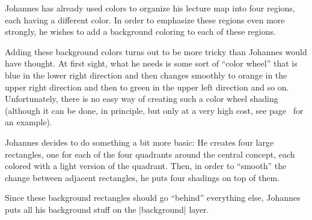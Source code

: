 Johannes has already used colors to organize his lecture map into four regions,
each having a different color. In order to emphasize these regions even more
strongly, he wishes to add a background coloring to each of these regions.

Adding these background colors turns out to be more tricky than Johannes would
have thought. At first sight, what he needs is some sort of ``color wheel''
that is blue in the lower right direction and then changes smoothly to orange
in the upper right direction and then to green in the upper left direction and
so on. Unfortunately, there is no easy way of creating such a color wheel
shading (although it can be done, in principle, but only at a very high cost,
see page~\pageref{shading-color-wheel} for an example).

Johannes decides to do something a bit more basic: He creates four large
rectangles, one for each of the four quadrants around the central concept, each
colored with a light version of the quadrant. Then, in order to ``smooth'' the
change between adjacent rectangles, he puts four shadings on top of them.

Since these background rectangles should go ``behind'' everything else,
Johannes puts all his background stuff on the |background| layer.

